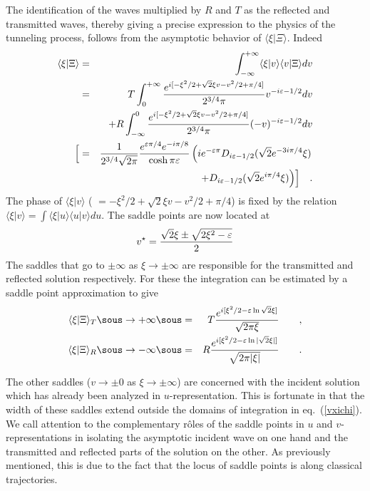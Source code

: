\documentclass[12pt,oneside]{report}
\def\mettresous#1\sous#2{\mathrel{\mathop{\kern0pt #2}\limits_{#1}}}
\def\braket#1#2{\mathrel{\langle #1|#2\rangle}}
\begin{document}
The identification of the waves 
multiplied by $R$ and $T$ as the reflected 
and transmitted waves,
thereby giving a
precise expression to the physics of the tunneling process, 
follows from
the asymptotic behavior of $\langle \xi |\Xi\rangle$. Indeed
\begin{eqnarray}
\langle \xi |\Xi\rangle &=&
\int^{+\infty}_{-\infty}\langle \xi |v\rangle \langle
v|\Xi\rangle dv
\nonumber  \\
&=&\  T \int^{+\infty}_{0}\frac {e^{i[-\xi^2/2+\sqrt{2}\xi
v-v^2/2+\pi/4]}}{2^{3/4}\pi}
v^{-i \varepsilon - 1/2}dv\nonumber  \\
& &+ R \int^{0}_{-\infty}\frac{e^{i[-\xi^2/2+\sqrt{2}\xi
v-v^2/2+\pi/4]}}{2^{3/4}\pi}
 (-v)^{-i \varepsilon - 1/2}dv\label{vxichi}  \\
\Bigl[&=&\frac{1}{2^{3/4}\sqrt{2\pi}}\frac{e^{\varepsilon \pi/4}e^{-i\pi/8}}
{\cosh{\pi\varepsilon}}
 \left(i e^{-\varepsilon\pi}D_{i\varepsilon
-1/2}(\sqrt{2}e^{-3i\pi/4}\xi)\right. \Bigr.\nonumber\\
&&\Bigl.\left.\quad\quad +D_{i\varepsilon
-1/2}(\sqrt{2}e^{i\pi/4}\xi)\right)\Bigr]\quad .
\end{eqnarray} 
The phase of $\braket{\xi}{v}$ (
$= -\xi^2/2+\sqrt{2}\xi v-v^2/2+\pi/4$) is fixed
by the relation $\braket{\xi}{v}=\int \braket{\xi}{u}\braket{u}{v} du$.
The saddle points 
are now located at 
\begin{eqnarray}
 v^{\star} =    
{\sqrt{2}\xi
\pm \sqrt{2\xi^2-\varepsilon}\over 2} \label{vsadpts} 
\end{eqnarray}
The saddles that go to $\pm \infty $ as $\xi \to \pm \infty $ are
responsible for the transmitted and reflected  solution respectively. For these
the integration can be estimated by a
saddle point approximation to give
\begin{eqnarray}
\langle \xi | \Xi \rangle_T & {\mettresous \xi \to + \infty
\sous =}
&T{e^{i[\xi^2/2-\varepsilon\ln\sqrt{2}\xi ]}\over \sqrt{2\pi\xi}}\qquad , 
\label{Txichi} \\
 \langle \xi | \Xi \rangle_R & {\mettresous \xi \to - \infty
\sous =}&R{e^{i[\xi^2/2-\varepsilon\ln|\sqrt{2}\xi |]}\over \sqrt{2\pi|\xi
|}}\qquad .
\label{Rxichi}
\end{eqnarray}

The other saddles ($v \to \pm 0$ as $\xi \to \pm \infty$)
are concerned with the incident
solution which has already been
analyzed in $u$-representation. This is fortunate in that  the width of these
saddles
extend outside the domains of integration
in eq.~(\ref{vxichi}). 
We call attention to the 
complementary r\^ oles of the saddle points in $u$ and $v$-representations 
in isolating the asymptotic incident wave on one hand and the transmitted and
reflected parts of the solution on the other.
As previously mentioned, this is due to the fact that the locus of saddle
points is along
classical trajectories.
\end{document}
